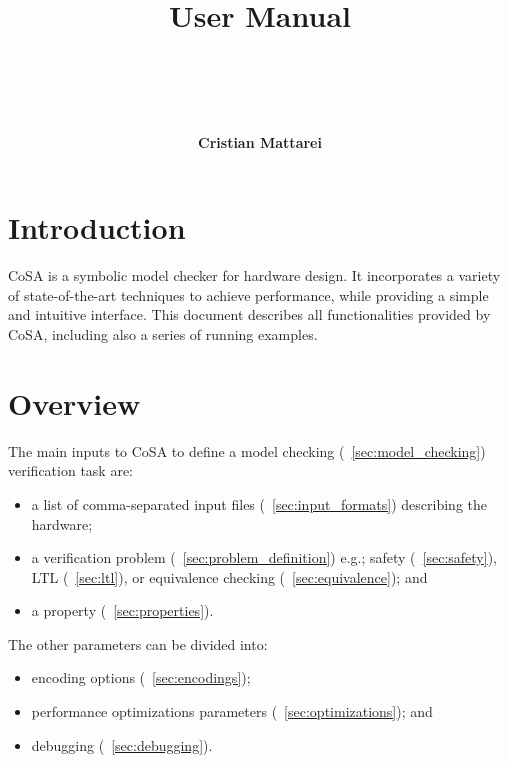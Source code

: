 \documentclass{article}
\theoremstyle{definition}
\begin{document}
\title{\\ \vspace{1cm}User Manual}
\author{\\ \\ \\ \\ \textbf{Cristian Mattarei}}

\maketitle

\newpage
\tableofcontents

\newpage
\section*{Introduction}

CoSA is a symbolic model checker for hardware design. It incorporates
a variety of state-of-the-art techniques to achieve performance, while
providing a simple and intuitive interface. This document describes
all functionalities provided by CoSA, including also a series of
running examples. 


\section{Overview}

The main inputs to CoSA to define a model checking
(\textsection~\ref{sec:model_checking}) verification task are:
\begin{itemize}
\item a list of comma-separated input files
  (\textsection~\ref{sec:input_formats}) describing the hardware;
\item a verification problem
  (\textsection~\ref{sec:problem_definition}) e.g.; safety
  (\textsection~\ref{sec:safety}), LTL (\textsection~\ref{sec:ltl}),
  or equivalence checking (\textsection~\ref{sec:equivalence}); and
\item a property (\textsection~\ref{sec:properties}).
\end{itemize}

\noindent
The other parameters can be divided into:
\begin{itemize}
\item encoding options (\textsection~\ref{sec:encodings});
\item performance optimizations parameters
  (\textsection~\ref{sec:optimizations}); and
\item debugging (\textsection~\ref{sec:debugging}).
\end{itemize}
\end{document}
